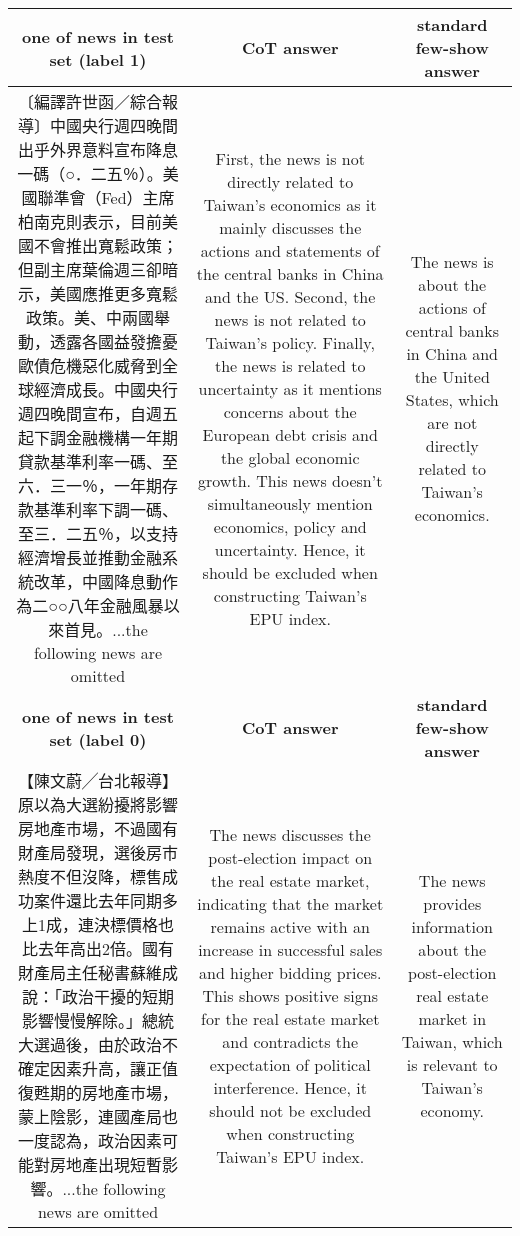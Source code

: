 {
\def\sym#1{\ifmmode^{#1}\else\(^{#1}\)\fi}
\begin{tabularx}{\textwidth}{c c c}
\hline

\textbf{one of news in test set (label 1)} & 
\textbf{CoT answer} & 
\textbf{standard few-show answer}\\
\hline
〔編譯許世函／綜合報導〕中國央行週四晚間出乎外界意料宣布降息一碼（○．二五％）。美國聯準會（Fed）主席柏南克則表示，目前美國不會推出寬鬆政策；但副主席葉倫週三卻暗示，美國應推更多寬鬆政策。美、中兩國舉動，透露各國益發擔憂歐債危機惡化威脅到全球經濟成長。中國央行週四晚間宣布，自週五起下調金融機構一年期貸款基準利率一碼、至六．三一％，一年期存款基準利率下調一碼、至三．二五％，以支持經濟增長並推動金融系統改革，中國降息動作為二○○八年金融風暴以來首見。...the following news are omitted
&
First, the news is not directly related to Taiwan's economics as it mainly discusses the actions and statements of the central banks in China and the US. Second, the news is not related to Taiwan's policy. Finally, the news is related to uncertainty as it mentions concerns about the European debt crisis and the global economic growth. This news doesn't simultaneously mention economics, policy and uncertainty. Hence, it should be excluded when constructing Taiwan's EPU index.
&
The news is about the actions of central banks in China and the United States, which are not directly related to Taiwan's economics.
\\
\hline

\textbf{one of news in test set (label 0)} & 
\textbf{CoT answer} & 
\textbf{standard few-show answer}\\
\hline

【陳文蔚╱台北報導】原以為大選紛擾將影響房地產市場，不過國有財產局發現，選後房市熱度不但沒降，標售成功案件還比去年同期多上1成，連決標價格也比去年高出2倍。國有財產局主任秘書蘇維成說：「政治干擾的短期影響慢慢解除。」總統大選過後，由於政治不確定因素升高，讓正值復甦期的房地產市場，蒙上陰影，連國產局也一度認為，政治因素可能對房地產出現短暫影響。...the following news are omitted
&
The news discusses the post-election impact on the real estate market, indicating that the market remains active with an increase in successful sales and higher bidding prices. This shows positive signs for the real estate market and contradicts the expectation of political interference. Hence, it should not be excluded when constructing Taiwan's EPU index.
&
The news provides information about the post-election real estate market in Taiwan, which is relevant to Taiwan's economy.
\\
\hline
\end{tabularx}
}
